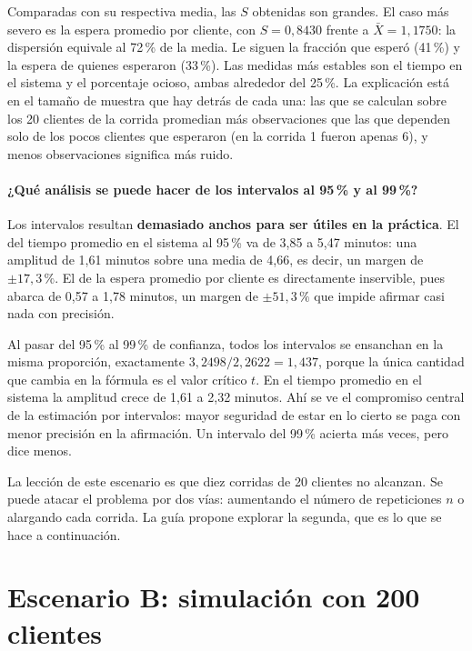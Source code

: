 \documentclass[11pt,letterpaper]{article}
\begin{document}
Comparadas con su respectiva media, las $S$ obtenidas son grandes. El caso más severo es la espera promedio por cliente, con $S = 0{,}8430$ frente a $\bar{X} = 1{,}1750$: la dispersión equivale al 72\,\% de la media. Le siguen la fracción que esperó (41\,\%) y la espera de quienes esperaron (33\,\%). Las medidas más estables son el tiempo en el sistema y el porcentaje ocioso, ambas alrededor del 25\,\%. La explicación está en el tamaño de muestra que hay detrás de cada una: las que se calculan sobre los 20 clientes de la corrida promedian más observaciones que las que dependen solo de los pocos clientes que esperaron (en la corrida 1 fueron apenas 6), y menos observaciones significa más ruido.

\paragraph{¿Qué análisis se puede hacer de los intervalos al 95\,\% y al 99\,\%?}

Los intervalos resultan \textbf{demasiado anchos para ser útiles en la práctica}. El del tiempo promedio en el sistema al 95\,\% va de 3,85 a 5,47 minutos: una amplitud de 1,61 minutos sobre una media de 4,66, es decir, un margen de $\pm 17{,}3\,\%$. El de la espera promedio por cliente es directamente inservible, pues abarca de 0,57 a 1,78 minutos, un margen de $\pm 51{,}3\,\%$ que impide afirmar casi nada con precisión.

Al pasar del 95\,\% al 99\,\% de confianza, todos los intervalos se ensanchan en la misma proporción, exactamente $3{,}2498 / 2{,}2622 = 1{,}437$, porque la única cantidad que cambia en la fórmula es el valor crítico $t$. En el tiempo promedio en el sistema la amplitud crece de 1,61 a 2,32 minutos. Ahí se ve el compromiso central de la estimación por intervalos: mayor seguridad de estar en lo cierto se paga con menor precisión en la afirmación. Un intervalo del 99\,\% acierta más veces, pero dice menos.

La lección de este escenario es que diez corridas de 20 clientes no alcanzan. Se puede atacar el problema por dos vías: aumentando el número de repeticiones $n$ o alargando cada corrida. La guía propone explorar la segunda, que es lo que se hace a continuación.

\section{Escenario B: simulación con 200 clientes}
\end{document}
